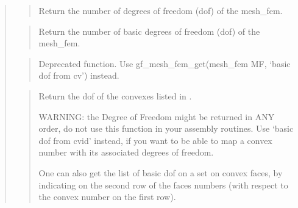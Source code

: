 \documentclass[a4paper,11pt,english]{sphinxmanual}
\begin{document}
\sphinxAtStartPar
{}
\begin{quote}

\sphinxAtStartPar
{}
\begin{quote}

\sphinxAtStartPar
Return the number of degrees of freedom (dof) of the mesh\_fem.
\end{quote}

\sphinxAtStartPar
{}
\begin{quote}

\sphinxAtStartPar
Return the number of basic degrees of freedom (dof) of the mesh\_fem.
\end{quote}

\sphinxAtStartPar
{}
\begin{quote}

\sphinxAtStartPar
Deprecated function. Use gf\_mesh\_fem\_get(mesh\_fem MF, ‘basic dof from cv’) instead.
\end{quote}

\sphinxAtStartPar
{}
\begin{quote}

\sphinxAtStartPar
Return the dof of the convexes listed in .

\sphinxAtStartPar
WARNING: the Degree of Freedom might be returned in ANY order, do
not use this function in your assembly routines. Use ‘basic dof from cvid’
instead, if you want to be able to map a convex number with its
associated degrees of freedom.

\sphinxAtStartPar
One can also get the list of basic dof on a set on convex faces, by
indicating on the second row of  the faces numbers (with
respect to the convex number on the first row).
\end{quote}

\sphinxAtStartPar
{}
\begin{quote}


\end{quote}
\end{quote}
\end{document}
